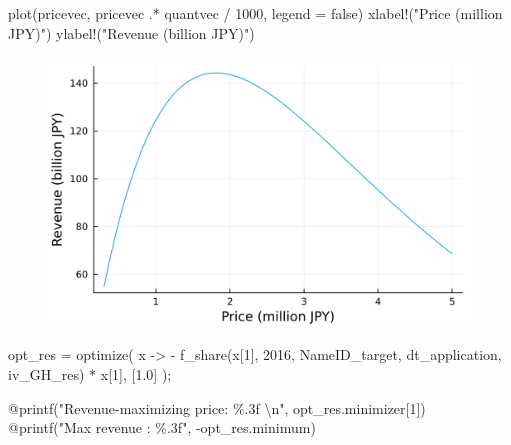 \documentclass[
  letterpaper,
  DIV=11,
  numbers=noendperiod]{scrreprt}
\newenvironment{Shaded}{\begin{snugshade}}{\end{snugshade}}
\newcommand{\ConstantTok}[1]{\textcolor[rgb]{0.56,0.35,0.01}{#1}}
\newcommand{\FloatTok}[1]{\textcolor[rgb]{0.68,0.00,0.00}{#1}}
\newcommand{\FunctionTok}[1]{\textcolor[rgb]{0.28,0.35,0.67}{#1}}
\newcommand{\NormalTok}[1]{\textcolor[rgb]{0.00,0.23,0.31}{#1}}
\newcommand{\OperatorTok}[1]{\textcolor[rgb]{0.37,0.37,0.37}{#1}}
\newcommand{\PreprocessorTok}[1]{\textcolor[rgb]{0.68,0.00,0.00}{#1}}
\newcommand{\SpecialCharTok}[1]{\textcolor[rgb]{0.37,0.37,0.37}{#1}}
\newcommand{\StringTok}[1]{\textcolor[rgb]{0.13,0.47,0.30}{#1}}
\begin{document}
\begin{Shaded}
\begin{Highlighting}[]
\FunctionTok{plot}\NormalTok{(pricevec, pricevec }\OperatorTok{.*}\NormalTok{ quantvec }\OperatorTok{/} \FloatTok{1000}\NormalTok{, legend }\OperatorTok{=} \ConstantTok{false}\NormalTok{)}
\FunctionTok{xlabel!}\NormalTok{(}\StringTok{"Price (million JPY)"}\NormalTok{)}
\FunctionTok{ylabel!}\NormalTok{(}\StringTok{"Revenue (billion JPY)"}\NormalTok{)}
\end{Highlighting}
\end{Shaded}

\begin{figure}[H]

{\centering \includegraphics{./demand_estimation_1_files/figure-pdf/cell-30-output-1.svg}

}

\end{figure}

\begin{Shaded}
\begin{Highlighting}[]
\NormalTok{opt\_res }\OperatorTok{=} \FunctionTok{optimize}\NormalTok{(}
\NormalTok{    x }\OperatorTok{{-}\textgreater{}} \OperatorTok{{-}} \FunctionTok{f\_share}\NormalTok{(x[}\FloatTok{1}\NormalTok{], }\FloatTok{2016}\NormalTok{, NameID\_target, dt\_application, iv\_GH\_res) }\OperatorTok{*}\NormalTok{ x[}\FloatTok{1}\NormalTok{],}
\NormalTok{    [}\FloatTok{1.0}\NormalTok{]}
\NormalTok{);}

\PreprocessorTok{@printf}\NormalTok{(}\StringTok{"Revenue{-}maximizing price: \%.3f }\SpecialCharTok{\textbackslash{}n}\StringTok{"}\NormalTok{, opt\_res.minimizer[}\FloatTok{1}\NormalTok{])}
\PreprocessorTok{@printf}\NormalTok{(}\StringTok{"Max revenue : \%.3f"}\NormalTok{, }\OperatorTok{{-}}\NormalTok{opt\_res.minimum)}
\end{Highlighting}
\end{Shaded}
\end{document}

